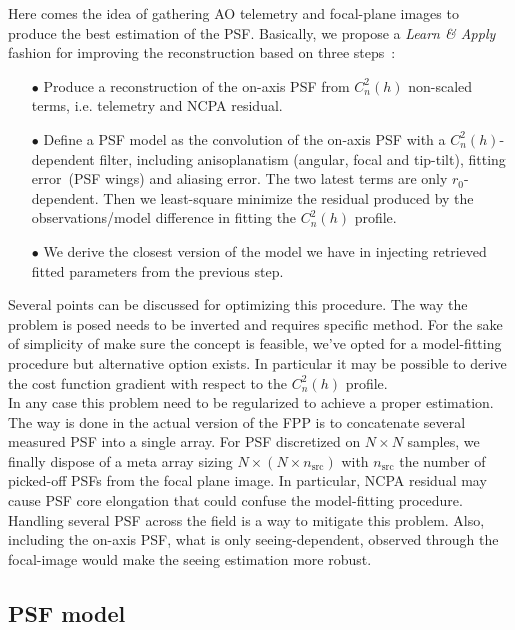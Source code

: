 \documentclass[12pt]{article}
\newcommand{\rz}{r_0}
\newcommand{\cnh}{C_n^2(h)}
\begin{document}
Here comes the idea of gathering AO telemetry and focal-plane images to produce the best estimation of the PSF. Basically, we propose a \emph{Learn \& Apply} fashion for improving the reconstruction based on three steps~:
\begin{itemize}
	\item[$\bullet$] Produce a reconstruction of the on-axis PSF from $\cnh$ non-scaled terms, i.e. telemetry and NCPA residual.
	\item[$\bullet$] Define a PSF model as the convolution of the on-axis PSF with a $\cnh$-dependent filter, including anisoplanatism (angular, focal and tip-tilt), fitting error~(PSF wings) and aliasing error. The two latest terms are only $\rz$-dependent. Then we least-square minimize the residual produced by the observations/model difference in fitting the $\cnh$ profile.
	\item[$\bullet$] We derive the closest version of the model we have in injecting retrieved fitted parameters from the previous step.
\end{itemize}

Several points can be discussed for optimizing this procedure. The way the problem is posed needs to be inverted and requires specific method. For the sake of simplicity of make sure the concept is feasible, we've opted for a model-fitting procedure but alternative option exists. In particular it may be possible to derive the cost function gradient with respect to the $\cnh$ profile.\\ 

In any case this problem need to be regularized to achieve a proper estimation. The way is done in the actual version of the FPP is to concatenate several measured PSF into a single array. For PSF discretized on $N\times N$ samples, we finally dispose of a meta array sizing $N\times (N\times n_\text{src})$ with $n_\text{src}$ the number of picked-off PSFs from the focal plane image. In particular, NCPA residual may cause PSF core elongation that could confuse the model-fitting procedure. Handling several PSF across the field is a way to mitigate this problem. Also, including the on-axis PSF, what is only seeing-dependent, observed through the focal-image would make the seeing estimation more robust.


\subsection{PSF model}
\end{document}
